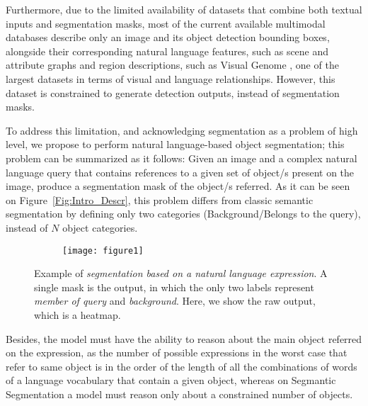 Furthermore, due to the limited availability of datasets that combine both textual inputs and segmentation masks, most of the current available multimodal databases describe only an image and its object detection bounding boxes, alongside their corresponding natural language features, such as scene and attribute graphs and region descriptions, such as Visual Genome \cite{krishna_visual_2016}, one of the largest datasets in terms of visual and language relationships. However, this dataset is constrained to generate detection outputs, instead of segmentation masks.

To address this limitation, and acknowledging segmentation as a problem of high level, we propose to perform natural language-based object segmentation; this problem can be summarized as it follows: Given an image and a complex natural language query that contains references to a given set of object/s present on the image, produce a segmentation mask of the object/s referred. As it can be seen on Figure~\ref{Fig:Intro_Descr}, this problem differs from classic semantic segmentation by defining only two categories (Background/Belongs to the query), instead of $N$ object categories.

\begin{figure}
	\centering
    \begin{subfigure}[b]{0.4\textwidth}
            \centering
            \texttt{[image: figure1]}
    \label{fig:fig1}
    \end{subfigure}
    \caption{\label{fig:query} Example of \textit{segmentation based on a natural language expression}. A single mask is the output, in which the only two labels represent \textit{member of query} and \textit{background}. Here, we show the raw output, which is a heatmap.}
\end{figure}

Besides, the model must have the ability to reason about the main object referred on the expression, as the number of possible expressions in the worst case that refer to same object is in the order of the length of all the combinations of words of a language vocabulary that contain a given object, whereas on Segmantic Segmentation a model must reason only about a constrained number of objects.

